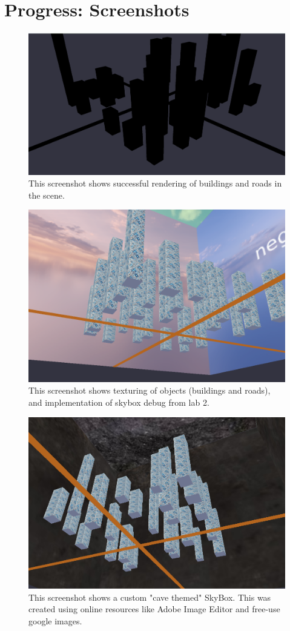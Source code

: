 \section*{\Huge{Progress: Screenshots}}
\newpage
\begin{figure}
    \centering
    \includegraphics[width=0.5\linewidth]{Results//Progress_screenshots/Screenshot 1 - Geometry.png}
    \caption{This screenshot shows successful rendering of buildings and roads in the scene.}
\end{figure}
\begin{figure}
    \centering
    \includegraphics[width=0.5\linewidth]{Results//Progress_screenshots/Screenshot 3a - Skybox.png}
    \caption{This screenshot shows texturing of objects (buildings and roads), and implementation of skybox debug from lab 2.}
\end{figure}
\begin{figure}
    \centering
    \includegraphics[width=0.5\linewidth]{Results//Progress_screenshots/Screenshot 3b - Custom Skybox.png.png}
    \caption{This screenshot shows a custom "cave themed" SkyBox. This was created using online resources like Adobe Image Editor and free-use google images.}
\end{figure}

